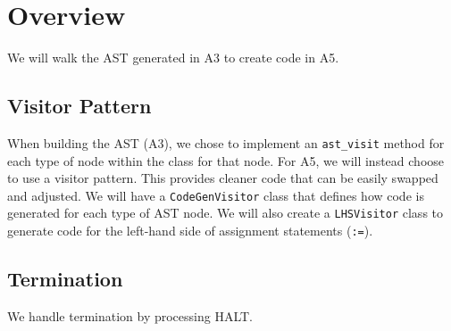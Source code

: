 \section{Overview}
We will walk the AST generated in A3 to create code in A5.

\subsection{Visitor Pattern}
When building the AST (A3), we chose to implement an \texttt{ast\_visit} method
for each type of node within the class for that node. For A5, we will
instead choose to use a visitor pattern. This provides cleaner code that can be
easily swapped and adjusted. We will have a \texttt{CodeGenVisitor} class that
defines how code is generated for each type of AST node. We will also create a
\texttt{LHSVisitor} class to generate code for the left-hand side of assignment
statements (\texttt{:=}).

\subsection{Termination}
We handle termination by processing HALT.


